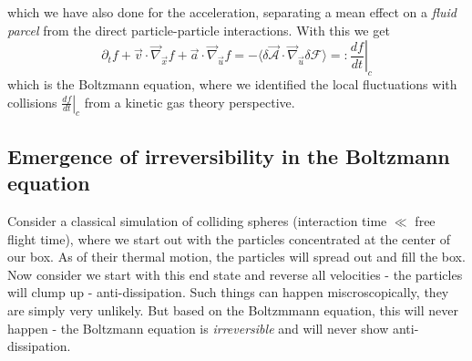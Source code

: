 which we have also done for the acceleration, separating a mean effect on a \textit{fluid parcel} from the direct particle-particle interactions. With this we
get
\begin{equation}
    \label{eq:boltzmann1}
    \partial_t f + \vec{v}\cdot \vec{\nabla}_{\vec{x}}f + \vec{a} \cdot \vec{\nabla}_{\vec{u}}f = -\langle \delta \vec{\mathcal{A}} \cdot \vec{\nabla}_{\vec{u}} \delta \mathcal{F} \rangle =: \left. \frac{df}{dt} \right|_c
\end{equation}
which is the Boltzmann equation, where we identified the local fluctuations with collisions $\left. \frac{df}{dt} \right|_c$ from a kinetic gas theory perspective.

\subsection{Emergence of irreversibility in the Boltzmann equation}
Consider a classical simulation of colliding spheres (interaction time $\ll$ free flight time), where
we start out with the particles concentrated at the center of our box. As of their thermal motion,
the particles will spread out and fill the box. Now consider we start with this end state
and reverse all velocities - the particles will clump up - anti-dissipation. Such things can
happen miscroscopically, they are simply very unlikely.
But based on the Boltzmmann equation, this will never happen - the Boltzmann equation is
\textit{irreversible} and will never show anti-dissipation. 

